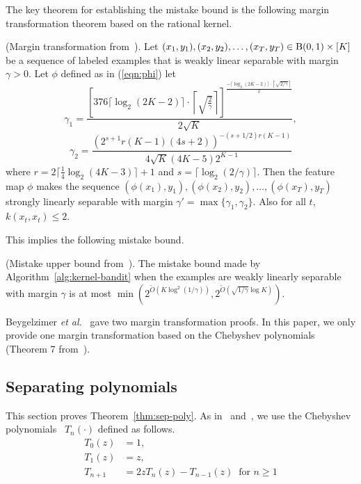   The key theorem for establishing the mistake bound is the following
margin transformation theorem based on the rational kernel.

\begin{theorem}
  (Margin transformation from~\cite{BeygelzimerPSTWZ2019-separable}). Let
  $(x_1,y_1),(x_2,y_2),\ldots,(x_T,y_T)\in {\mathrm{B}}(0,1)\times [K]$ be a
  sequence of labeled examples that is weakly linear separable with
  margin $\gamma >0$.  Let $\phi$ defined as in (\ref{eqn:phi}) let
  \[
  \gamma_1 = \frac{
    \left[376\lceil\log_2(2K-2)\rceil\cdot\left\lceil\sqrt{\frac{2}{\gamma}}\right\rceil\right]^{
      \frac{-\lceil\log_2(2K-2)\rceil\cdot
      \left\lceil\sqrt{2/\gamma}\right\rceil}{2}}
  }{2\sqrt{K}},
  \]
  \[
  \gamma_2 =
  \frac{
    \left(2^{s+1}r(K-1)(4s+2)\right)^{-(s+1/2)r(K-1)}
  }{
    4\sqrt{K}(4K-5)2^{K-1}
  }
  \]
  where $r=2\lceil\frac{1}{4}\log_2(4K-3)\rceil+1$ and
  $s=\lceil\log_2(2/\gamma)\rceil$.  Then the feature map $\phi$ makes
  the sequence $(\phi (x_1),y_1),(\phi (x_2),y_2),\ldots,(\phi
  (x_T),y_T)$ strongly linearly separable with margin
  $\gamma'=\max\{\gamma_1,\gamma_2\}$.  Also for all $t$,
  $k(x_t,x_t)\leq 2$.
\end{theorem}

This implies the following mistake bound.
\begin{corollary}
    (Mistake upper bound
    from~\cite{BeygelzimerPSTWZ2019-separable}). The mistake bound made
    by Algorithm~\ref{alg:kernel-bandit} when the examples are weakly
    linearly separable with margin $\gamma$ is at most
    $\min(2^{\tilde{O}(K\log^2(1/\gamma))},2^{\tilde{O}(\sqrt{1/\gamma}\log
      K)})$.
  \end{corollary}
  
  Beygelzimer {\em et al.}~\cite{BeygelzimerPSTWZ2019-separable} gave two margin transformation proofs.  
  In this paper, we only provide one margin transformation based on the Chebyshev polynomials (Theorem 7 from~\cite{BeygelzimerPSTWZ2019-separable}).

\subsection{Separating polynomials}
\label{sect:sep-poly}

This section proves Theorem~\ref{thm:sep-poly}.  As
in~\cite{BeygelzimerPSTWZ2019-separable}
and~\cite{KlivansS2004-halfspaces-margin}, we use the Chebyshev
polynomials~\cite{MasonH2002-chebyshev} $T_n(\cdot)$ defined as
follows.
\begin{align*}
    T_0(z)&=1,\\
    T_1(z)&=z,\\
    T_{n+1}&=2z T_n(z)-T_{n-1}(z) \;\;\text{for $n\geq 1$}
\end{align*}

